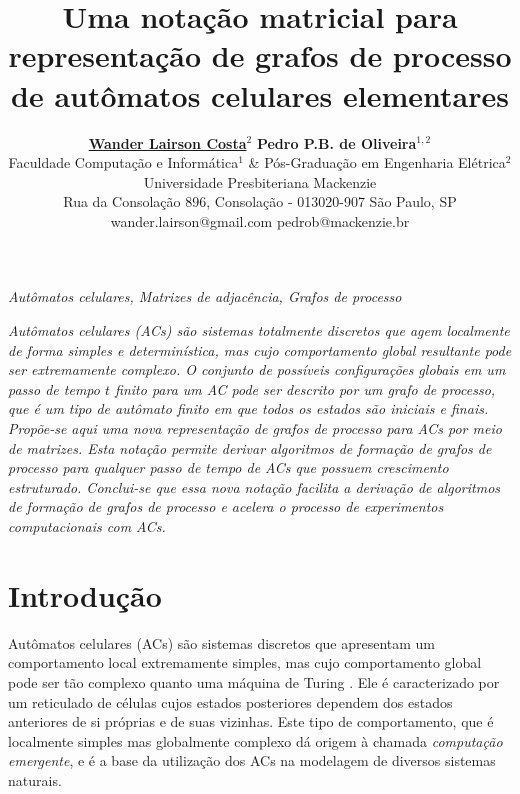 \documentclass[a4,11pt]{article}
\begin{document}
\title{ \Large{\bf Uma notação matricial para representação de grafos de processo de autômatos celulares elementares}}

\author{ {\bf {\large \underline{Wander Lairson Costa}$^2$}} \hspace*{1cm} {\bf {\large
 Pedro P.B. de Oliveira$^{1,2}$}}  \\
 {\small Faculdade Computação e Informática$^1$ \& Pós-Graduação em Engenharia Elétrica$^2$} \\
 {\small Universidade Presbiteriana Mackenzie} \\
 {\small Rua da Consolação 896, Consolação - 013020-907 São Paulo, SP} \\
 {\small wander.lairson@gmail.com \hspace*{.2cm}  pedrob@mackenzie.br} }

\date{}

\maketitle

\thispagestyle{empty}
 {\it Autômatos celulares, Matrizes de adjacência, Grafos de processo}

\vspace{5ex}

\textit{Autômatos celulares (ACs) são sistemas totalmente discretos que agem
localmente de forma simples e determinística, mas cujo comportamento
global resultante pode ser extremamente complexo. O conjunto de possíveis
configurações globais em um passo de tempo $t$ finito para um AC pode ser
descrito por um grafo de processo, que é um tipo de autômato finito em que
todos os estados são iniciais e finais. Propõe-se aqui uma nova representação
de grafos de processo para ACs por meio de matrizes. Esta notação
permite derivar algoritmos de formação de grafos de processo para qualquer passo
de tempo de ACs que possuem crescimento estruturado.
Conclui-se que essa nova notação facilita a derivação de algoritmos de formação de
grafos de processo e acelera o processo de experimentos computacionais com ACs.}

\section{Introdução} 

Autômatos celulares (ACs) são sistemas discretos que apresentam um comportamento
local extremamente simples, mas cujo comportamento global pode ser tão
complexo quanto uma máquina de Turing \cite{wolfram1984a}. Ele
é caracterizado por um reticulado de células cujos estados posteriores
dependem dos estados anteriores de si próprias e de suas vizinhas.
Este tipo de comportamento, que é localmente simples mas globalmente
complexo dá origem à chamada \textit{computação emergente}, e é
a base da utilização dos ACs na modelagem de diversos sistemas naturais.
\end{document}
